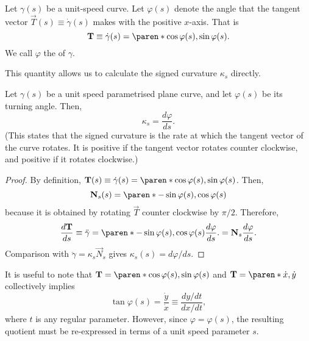 \documentclass[11pt]{penrose}
\newcommand{\vT}{\vec{T}}
\newcommand{\vN}{\vec{N}}
\begin{document}
\begin{ndfn}
    Let $\gamma(s)$ be a unit-speed curve. Let $\varphi(s)$ denote the angle that the tangent vector $\vT(s) \equiv \dot{\gamma}(s)$ makes with the positive $x$-axis. That is
    \begin{equation}
        \vT \equiv \dot{\gamma}(s) = \paren*{\cos\varphi(s), \sin\varphi(s)}.
    \end{equation}
    We call $\varphi$ the  of $\gamma$.
\end{ndfn}

This quantity allows us to calculate the signed curvature $\kappa_s$ directly.

\begin{nprop}
    Let $\gamma(s)$ be a unit speed parametrised plane curve, and let $\varphi(s)$ be its turning angle. Then,
    \begin{equation*}
        \kappa_s = \frac{d\varphi}{ds}.
    \end{equation*}
    (This states that the signed curvature is the rate at which the tangent vector of the curve rotates. It is positive if the tangent vector rotates counter clockwise, and positive if it rotates clockwise.)
\end{nprop}
\begin{proof}
    By definition, $\vT(s) \equiv \dot{\gamma}(s) = \paren*{\cos\varphi(s), \sin\varphi(s)}$. Then,
    \begin{equation}
        \vN_s(s) = \paren*{-\sin\varphi(s), \cos\varphi(s)}
    \end{equation}
    because it is obtained by rotating $\vT$ counter clockwise by $\pi/2$. Therefore,
    \begin{equation}
        \frac{d\vT}{ds} \equiv \ddot{\gamma}
        = \paren*{-\sin\varphi(s), \cos\varphi(s)} \frac{d\varphi}{ds}.
        = \vN_s \frac{d\varphi}{ds}.
    \end{equation}
    Comparison with $\ddot{\gamma} = \kappa_s \vN_s$ gives $\kappa_s(s) = d\varphi/ds$.
\end{proof}

It is useful to note that $\vT = \paren*{\cos\varphi(s), \sin\varphi(s)}$ and $\vT = \paren*{\dot{x}, \dot{y}}$ collectively implies
\begin{equation}
    \tan\varphi(s) = \frac{\dot{y}}{\dot{x}} \equiv \frac{dy/dt}{dx/dt},
\end{equation}
where $t$ is any regular parameter. However, since $\varphi = \varphi(s)$, the resulting quotient must be re-expressed in terms of a unit speed parameter $s$.
\end{document}
